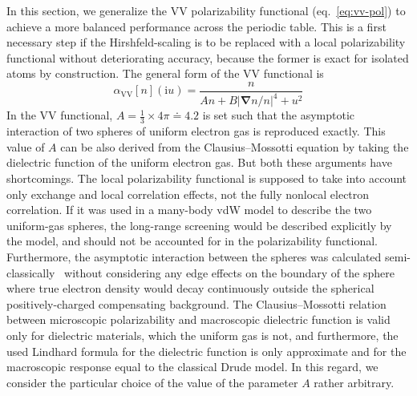 In this section, we generalize the VV polarizability functional (eq.~\ref{eq:vv-pol}) to achieve a more balanced performance across the periodic table.
This is a first necessary step if the Hirshfeld-scaling is to be replaced with a local polarizability functional without deteriorating accuracy, because the former is exact for isolated atoms by construction.
The general form of the VV functional is
\begin{equation}
  \alpha_\text{VV}[n](\mathrm iu)=\frac{n}{An+B|\boldsymbol\nabla n/n|^4+u^2}
\end{equation}
In the VV functional, $A=\frac13\times4\pi\doteq4.2$ is set such that the asymptotic interaction of two spheres of uniform electron gas is reproduced exactly.
This value of $A$ can be also derived from the Clausius--Mossotti equation by taking the dielectric function of the uniform electron gas.
But both these arguments have shortcomings.
The local polarizability functional is supposed to take into account only exchange and local correlation effects, not the fully nonlocal electron correlation.
If it was used in a many-body vdW model to describe the two uniform-gas spheres, the long-range screening would be described explicitly by the model, and should not be accounted for in the polarizability functional.
Furthermore, the asymptotic interaction between the spheres was calculated semi-classically~\cite{LucasPRB75} without considering any edge effects on the boundary of the sphere where true electron density would decay continuously outside the spherical positively-charged compensating background.
The Clausius--Mossotti relation between microscopic polarizability and macroscopic dielectric function is valid only for dielectric materials, which the uniform gas is not, and furthermore, the used Lindhard formula for the dielectric function is only approximate and for the macroscopic response equal to the classical Drude model.
In this regard, we consider the particular choice of the value of the parameter $A$ rather arbitrary.

